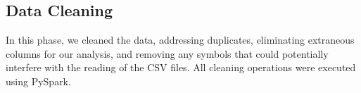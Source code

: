 \subsection*{Data Cleaning}
In this phase, we cleaned the data, addressing duplicates, eliminating extraneous columns for our analysis, and removing any symbols that could potentially interfere with the reading of the CSV files. All cleaning operations were executed using PySpark.
